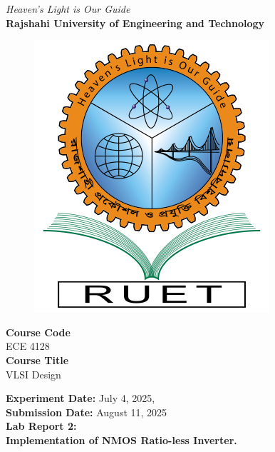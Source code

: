 \vspace*{\fill}
\begin{center}

    \emph{Heaven's Light is Our Guide} \\
    \textbf{Rajshahi University of Engineering and Technology} \\

    \begin{figure}[H]
        \centering
        \includegraphics[scale=.34]{images/RUET_logo.png}
        \label{fig:ruet_logo}
    \end{figure}
    \vspace{5mm}

    \textbf{Course Code}\\
    ECE 4128\\
    \vspace{3mm}
    \textbf{Course Title}\\
    VLSI Design

    \vspace{5mm}
    \textbf{Experiment Date:} {July 4, 2025},\\
    \textbf{Submission Date:} {August 11, 2025}\\

    \vspace{5mm}
    \textbf{Lab Report 2: \\
        Implementation of NMOS Ratio-less Inverter.}

    \vspace{15mm}


\end{center}
